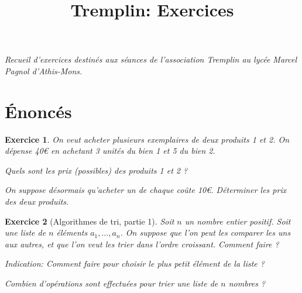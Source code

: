 \documentclass[12pt]{article}
\title{Tremplin: Exercices}
\author{}
\theoremstyle{break}
\newtheorem{exo}{Exercice}
\begin{document}
\maketitle

\textit{Recueil d'exercices destinés aux séances de l'association Tremplin au lycée Marcel Pagnol d'Athis-Mons.}


\section*{Énoncés}

\begin{exo}
On veut acheter plusieurs exemplaires de deux produits 1 et 2. On dépense 40€ en achetant 3 unités du bien 1 et 5 du bien 2.

Quels sont les prix (possibles) des produits 1 et 2 ?

On suppose désormais qu'acheter un de chaque coûte 10€. Déterminer les prix des deux produits.
\end{exo}


\begin{exo}[Algorithmes de tri, partie 1]
Soit $n$ un nombre entier positif. Soit une liste de $n$ éléments $a_1,\ldots,a_n$. On suppose que l'on peut les comparer les uns aux autres, et que l'on veut les trier dans l'ordre croissant. Comment faire ?

\textit{Indication: Comment faire pour choisir le plus petit élément de la liste ?}

Combien d'opérations sont effectuées pour trier une liste de $n$ nombres ?
\end{exo}
\end{document}
